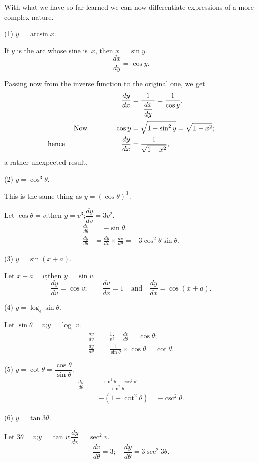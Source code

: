\documentclass[12pt,openany]{book}%
\begin{document}
With what we have so far learned we can now differentiate expressions of a
more complex nature.

(1) $y=\arcsin x$.

If $y$ is the arc whose sine is~$x$, then $x = \sin y$.
\[
\frac{dx}{dy}=\cos y.
\]


Passing now from the inverse function to the original one, we get
\begin{align*}
\frac{dy}{dx}  &  = \frac{1}{\;\dfrac{dx}{dy}\;} = \frac{1}{\cos y}.\\
\text{Now\qquad\qquad} \cos y  &  = \sqrt{1-\sin^{2} y}=\sqrt{1-x^{2}};\\
\text{hence\qquad\qquad\qquad\qquad} \frac{dy}{dx}  &  = \frac{1}%
{\sqrt{1-x^{2}}},
\end{align*}
a rather unexpected result.

(2) $y=\cos^{3} \theta$.

This is the same thing as $y=(\cos\theta)^{3}$.

Let $\cos\theta=v$;\quad then $y=v^{3}$;\quad$\dfrac{dy}{dv}=3v^{2}$.
\begin{align*}
\frac{dv}{d\theta}  &  = -\sin\theta.\\
\frac{dy}{d\theta}  &  = \frac{dy}{dv} \times\frac{dv}{d\theta} = -3 \cos^{2}
\theta\sin\theta.
\end{align*}


(3) $y=\sin(x+a)$.

Let $x+a=v$;\quad then $y=\sin v$.
\[
\frac{dy}{dv}=\cos v;\qquad\frac{dv}{dx}=1 \quad\text{and}\quad\frac{dy}%
{dx}=\cos(x+a).
\]


(4) $y=\log_{\epsilon}\sin\theta$.

Let $\sin\theta=v$;\quad$y=\log_{\epsilon}v$.
\begin{align*}
\frac{dy}{dv}  &  = \frac{1}{v};\quad\frac{dv}{d\theta}=\cos\theta;\\
\frac{dy}{d\theta}  &  = \frac{1}{\sin\theta} \times\cos\theta= \cot\theta.
\end{align*}


(5) $y=\cot\theta=\dfrac{\cos\theta}{\sin\theta}$.
\begin{align*}
\frac{dy}{d\theta}  &  = \frac{-\sin^{2}\theta- \cos^{2} \theta}{\sin^{2}
\theta}\\
&  = -(1+\cot^{2} \theta) = -\csc^{2} \theta.
\end{align*}


(6) $y=\tan3\theta$.

Let $3\theta=v$;\quad$y=\tan v$;\quad$\dfrac{dy}{dv}=\sec^{2} v$.
\[
\frac{dv}{d\theta}=3;\quad\frac{dy}{d\theta}=3 \sec^{2} 3\theta.
\]
\end{document}
